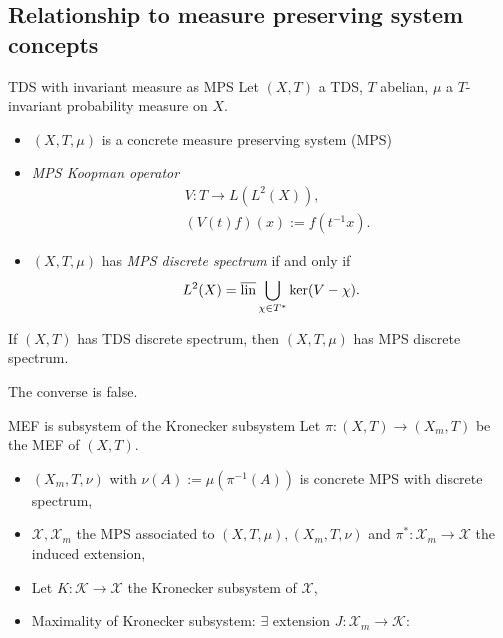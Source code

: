\subsection{Relationship to measure preserving system concepts}
\begin{frame}{TDS with invariant measure as MPS}
Let $(X,T)$ a TDS, $T$ abelian, $\mu$ a $T$-invariant probability measure on $X$.
\begin{itemize}
  \item $(X,T,\mu)$ is a concrete measure preserving system (MPS)
  \item \emph{MPS Koopman operator}
\begin{equation*}
  \begin{split}
    &V : T \to L(L^2(X)),\\
    & (V(t) f)(x) := f (t^{-1} x). 
  \end{split}
\end{equation*}
\item
  $(X,T,\mu)$ has \emph{MPS discrete spectrum} if and only if
  \begin{equation*}
    L^2(X) = \overline{\operatorname{lin}} \bigcup_{\chi \in T^*} \ker (V - \chi).
  \end{equation*}
\end{itemize}
\pause
\begin{proposition}
  If $(X,T)$ has TDS discrete spectrum, then $(X,T,\mu)$ has MPS discrete spectrum.
  \end{proposition}
  The converse is false.
\end{frame}
\begin{frame}[fragile]{MEF is subsystem of the Kronecker subsystem}
  Let $\pi : (X,T) \to (X_m,T)$ be the MEF of $(X,T)$.
  \begin{itemize}
    \item $(X_m,T, \nu)$ with $\nu(A):=  \mu(\pi^{-1}(A))$ is concrete MPS with discrete spectrum,
  \item $\mathcal{X}, \mathcal{X}_m$ the MPS associated to $(X,T,\mu), (X_m,T,\nu)$ and $\pi^* : \mathcal{X}_m \to \mathcal{X}$ the induced extension,
  \item Let $K: \mathcal{K} \to \mathcal{X}$ the Kronecker subsystem of $\mathcal{X}$,
  \item Maximality of Kronecker subsystem: $\exists$ extension $J: \mathcal{X}_m \to \mathcal{K}$:
\end{itemize}
  \begin{center}
  \end{center}
  \end{frame}

